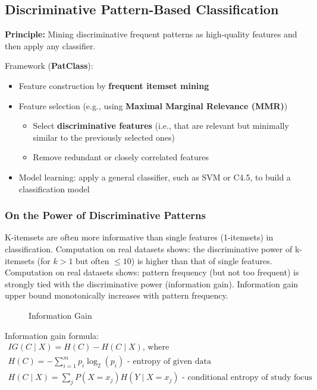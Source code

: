\subsection{Discriminative Pattern-Based Classification}
\textbf{Principle:} Mining discriminative frequent patterns as high-quality
features and then apply any classifier.

Framework (\textbf{PatClass}):
\begin{itemize}
\item Feature construction by \textbf{frequent itemset mining}
\item Feature selection (e.g., using \textbf{Maximal Marginal Relevance (MMR)})
\begin{itemize}
\item Select \textbf{discriminative features} (i.e., that are relevant but minimally similar to the previously selected ones)
\item Remove redundant or closely correlated features
\end{itemize}
\item Model learning: apply a general classifier, such as SVM or C4.5, to build a classification model
\end{itemize}

\subsubsection{On the Power of Discriminative Patterns}
K-itemsets are often more informative than single features (1-itemsets) in classification. Computation on real datasets shows: the discriminative power of k-itemsets (for $k > 1$ but often $\leqslant 10$) is higher than that of single features.\\

Computation on real datasets shows: pattern frequency (but not too frequent) is strongly tied with the discriminative power (information gain). Information gain upper bound monotonically increases with pattern frequency.

\begin{figure}[H]
\centering
{}
\quad
{}
\caption{Information Gain}
\label{fig:ig}
\end{figure}

Information gain formula:
\begin{gather*}
IG (C \mid X) = H (C) - H (C \mid X)\text{, where }\\
H(C) = -\sum^{m}_{i=1}p_i \log_2(p_i)\text{ - entropy of given data}\\
H(C \mid X) = \sum_j P(X=x_j) H(Y \mid X=x_j)\text{ - conditional entropy of study focus}
\end{gather*}


